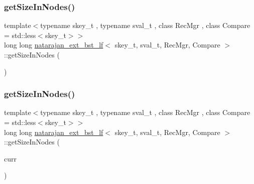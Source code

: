 \mbox{\label{classnatarajan__ext__bst__lf_aaf5630b2b2852d681914c9ac47b622fd}} 
\subsubsection{\texorpdfstring{get\+Size\+In\+Nodes()}{getSizeInNodes()}\hspace{0.1cm}{\footnotesize\ttfamily [2/4]}}
{\footnotesize\ttfamily template$<$typename skey\+\_\+t , typename sval\+\_\+t , class Rec\+Mgr , class Compare  = std\+::less$<$skey\+\_\+t$>$$>$ \\
long long \hyperlink{classnatarajan__ext__bst__lf}{natarajan\+\_\+ext\+\_\+bst\+\_\+lf}$<$ skey\+\_\+t, sval\+\_\+t, Rec\+Mgr, Compare $>$\+::get\+Size\+In\+Nodes (\begin{DoxyParamCaption}{ }\end{DoxyParamCaption})\hspace{0.3cm}{\ttfamily [inline]}}

\mbox{\label{classnatarajan__ext__bst__lf_a39d920a7b800482d29679e70b79fb04e}} 
\subsubsection{\texorpdfstring{get\+Size\+In\+Nodes()}{getSizeInNodes()}\hspace{0.1cm}{\footnotesize\ttfamily [3/4]}}
{\footnotesize\ttfamily template$<$typename skey\+\_\+t , typename sval\+\_\+t , class Rec\+Mgr , class Compare  = std\+::less$<$skey\+\_\+t$>$$>$ \\
long long \hyperlink{classnatarajan__ext__bst__lf}{natarajan\+\_\+ext\+\_\+bst\+\_\+lf}$<$ skey\+\_\+t, sval\+\_\+t, Rec\+Mgr, Compare $>$\+::get\+Size\+In\+Nodes (\begin{DoxyParamCaption}\item[{\hyperlink{structnode__t}{node\+\_\+t}$<$ skey\+\_\+t, sval\+\_\+t $>$ $\ast$const}]{curr }\end{DoxyParamCaption})\hspace{0.3cm}{\ttfamily [inline]}}

